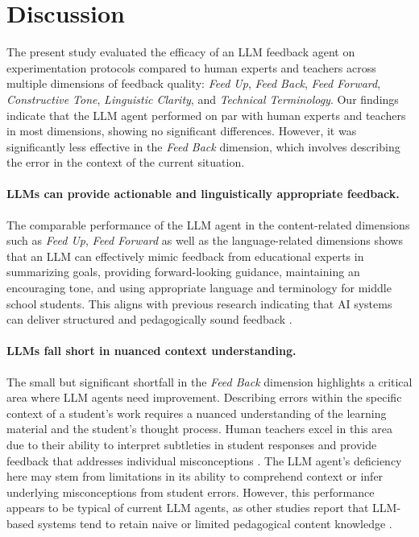 \section{Discussion}
The present study evaluated the efficacy of an LLM feedback agent on experimentation protocols compared to human experts and teachers across multiple dimensions of feedback quality: \textit{Feed Up}, \textit{Feed Back}, \textit{Feed Forward}, \textit{Constructive Tone}, \textit{Linguistic Clarity}, and \textit{Technical Terminology}. Our findings indicate that the LLM agent performed on par with human experts and teachers in most dimensions, showing no significant differences. However, it was significantly less effective in the \textit{Feed Back} dimension, which involves describing the error in the context of the current situation.

\paragraph{LLMs can provide actionable and linguistically appropriate feedback.} The comparable performance of the LLM agent in the content-related dimensions such as \textit{Feed Up}, \textit{Feed Forward} as well as the language-related dimensions shows that an LLM can effectively mimic feedback from educational experts in summarizing goals, providing forward-looking guidance, maintaining an encouraging tone, and using appropriate language and terminology for middle school students. This aligns with previous research indicating that AI systems can deliver structured and pedagogically sound feedback \citep{guo2024using, sessler2023peer,fung2024automatic,cohn2023towards}.

\paragraph{LLMs fall short in nuanced context understanding.}
The small but significant shortfall in the \textit{Feed Back} dimension highlights a critical area where LLM agents need improvement. Describing errors within the specific context of a student's work requires a nuanced understanding of the learning material and the student's thought process. Human teachers excel in this area due to their ability to interpret subtleties in student responses and provide feedback that addresses individual misconceptions \citep{shute2008focus}. The LLM agent's deficiency here may stem from limitations in its ability to comprehend context or infer underlying misconceptions from student errors.
However, this performance appears to be typical of current LLM agents, as other studies report that LLM-based systems tend to retain naive or limited pedagogical content knowledge \cite{chapagain2024explanations, tseng2024effectiveness}.


